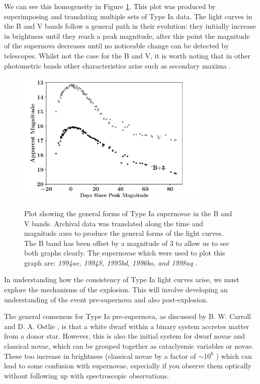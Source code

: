 \documentclass[twocolumn]{revtex4}
\begin{document}
We can see this homogeneity in Figure \ref{fig:typeia}. This plot was produced by superimposing and translating multiple sets of Type Ia data. The light curves in the B and V bands follow a general path in their evolution: they initially increase in brightness until they reach a peak magnitude, after this point the magnitude of the supernova decreases until no noticeable change can be detected by telescopes. Whilst not the case for the B and V, it is worth noting that in other photometric bands other characteristics arise such as secondary maxima \cite{obs_phys_class_sn}.
\begin{figure}[!h]
\begin{center}
\includegraphics[width=9.25cm]{intro/typeia}
\caption[]{Plot showing the general forms of Type Ia supernovae in the B and V bands. Archival data was translated along the time and magnitude axes to produce the general forms of the light curves. The B band has been offset by a magnitude of $3$ to allow us to see both graphs clearly. The supernovae which were used to plot this graph are: \em{1994ae, 1994S, 1995bd, 1996bo, }\em  and \em{1998aq }\em \cite{jha, matheson}. }
\vspace{-3ex}
\label{fig:typeia}
\end{center}
\end{figure}

In understanding how the consistency of Type Ia light curves arise, we must explore the mechanisms of the explosion. This will involve developing an understanding of the event pre-supernova and also post-explosion.

The general consensus for Type Ia pre-supernova, as discussed by B. W. Carroll and D. A. Ostlie \cite{mod_ast}, is that a white dwarf within a binary system accretes matter from a donor star. However, this is also the initial system for dwarf novae and classical novae, which can be grouped together as cataclysmic variables or novae. These too increase in brightness (classical novae by a factor of $\sim 10^6$ \cite{mod_ast}) which can lead to some confusion with supernovae, especially if you observe them optically without following up with spectroscopic observations. 
\end{document}
